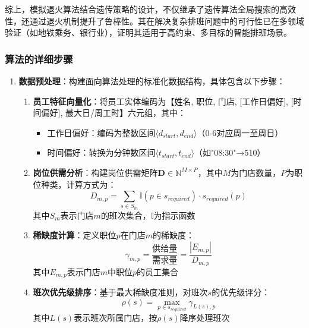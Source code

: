 综上，模拟退火算法结合遗传策略的设计，不仅继承了遗传算法全局搜索的高效性，还通过退火机制提升了鲁棒性。其在解决复杂排班问题中的可行性已在多领域验证（如地铁乘务\cite{1014151664.nh}、银行业\cite{1016015859.nh}），证明其适用于高约束、多目标的智能排班场景。

\subsubsection{算法的详细步骤}
\begin{enumerate}
    \item \textbf{数据预处理}：构建面向算法处理的标准化数据结构，具体包含以下步骤：
    \begin{enumerate}
        \item \textbf{员工特征向量化}：将员工实体编码为【姓名, 职位, 门店, [工作日偏好], [时间偏好], 最大日/周工时】六元组，其中：
        \begin{itemize}
            \item 工作日偏好：编码为整数区间$\langle d_{start}, d_{end} \rangle$（0-6对应周一至周日）
            \item 时间偏好：转换为分钟数区间$\langle t_{start}, t_{end} \rangle$（如"08:30"→510）
        \end{itemize}
        
        \item \textbf{岗位供需分析}：构建岗位供需矩阵$\mathbf{D} \in \mathbb{N}^{M \times P}$，其中$M$为门店数量，$P$为职位种类，计算方式为：
        \begin{equation}
            D_{m,p} = \sum_{s \in S_m} \mathbb{I}(p \in s_{required}) \cdot s_{required}(p)
        \end{equation}
        其中$S_m$表示门店$m$的班次集合，$\mathbb{I}$为指示函数
        
        \item \textbf{稀缺度计算}：定义职位$p$在门店$m$的稀缺度：
        \begin{equation}
            \gamma_{m,p} = \frac{\text{供给量}}{\text{需求量}} = \frac{|E_{m,p}|}{D_{m,p}}
        \end{equation}
        其中$E_{m,p}$表示门店$m$中职位$p$的员工集合
        
        \item \textbf{班次优先级排序}：基于最大稀缺度准则，对班次$s$的优先级评分：
        \begin{equation}
            \rho(s) = \max_{p \in s_{required}} \gamma_{L(s),p}
        \end{equation}
        其中$L(s)$表示班次所属门店，按$\rho(s)$降序处理班次
    \end{enumerate}
    

\end{enumerate}
